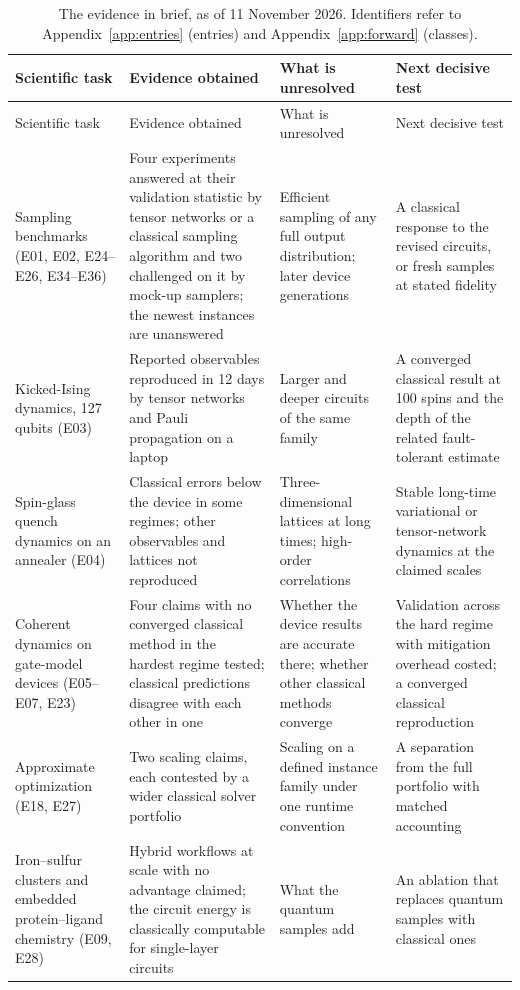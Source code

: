 \documentclass[10pt,a4paper]{article}
\begin{document}
{\small
\setlength{\tabcolsep}{4pt}
\begin{longtable}{@{}L{3.0cm} L{4.7cm} L{4.1cm} L{4.1cm}@{}}
\caption{The evidence in brief, as of 11 November 2026. Identifiers refer to Appendix~\ref{app:entries} (entries) and Appendix~\ref{app:forward} (classes).}\label{tab:summary}\\
\toprule
Scientific task & Evidence obtained & What is unresolved & Next decisive test\\
\midrule\endfirsthead
\toprule
Scientific task & Evidence obtained & What is unresolved & Next decisive test\\
\midrule\endhead
\bottomrule\endfoot
Sampling benchmarks (E01, E02, E24--E26, E34--E36) & Four experiments answered at their validation statistic by tensor networks or a classical sampling algorithm and two challenged on it by mock-up samplers; the newest instances are unanswered & Efficient sampling of any full output distribution; later device generations & A classical response to the revised circuits, or fresh samples at stated fidelity\\
Kicked-Ising dynamics, 127 qubits (E03) & Reported observables reproduced in 12 days by tensor networks and Pauli propagation on a laptop & Larger and deeper circuits of the same family & A converged classical result at 100 spins and the depth of the related fault-tolerant estimate\\
Spin-glass quench dynamics on an annealer (E04) & Classical errors below the device in some regimes; other observables and lattices not reproduced & Three-dimensional lattices at long times; high-order correlations & Stable long-time variational or tensor-network dynamics at the claimed scales\\
Coherent dynamics on gate-model devices (E05--E07, E23) & Four claims with no converged classical method in the hardest regime tested; classical predictions disagree with each other in one & Whether the device results are accurate there; whether other classical methods converge & Validation across the hard regime with mitigation overhead costed; a converged classical reproduction\\
Approximate optimization (E18, E27) & Two scaling claims, each contested by a wider classical solver portfolio & Scaling on a defined instance family under one runtime convention & A separation from the full portfolio with matched accounting\\
Iron--sulfur clusters and embedded protein--ligand chemistry (E09, E28) & Hybrid workflows at scale with no advantage claimed; the circuit energy is classically computable for single-layer circuits & What the quantum samples add & An ablation that replaces quantum samples with classical ones\\

\end{longtable}}
\end{document}
